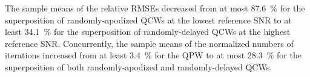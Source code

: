 The sample means of
the relative \acp{RMSE} decreased from
at most \SI{87.6}{\percent} for
the superposition of
randomly-apodized \acp{QCW} at
the lowest reference \ac{SNR} to
at least \SI{34.1}{\percent} for
the superposition of
randomly-delayed \acp{QCW} at
the highest reference \ac{SNR}.
Concurrently,
the sample means of
the normalized numbers of
iterations increased from
at least \SI{3.4}{\percent} for
the \ac{QPW} to
at most \SI{28.3}{\percent} for
the superposition of both
randomly-apodized and
randomly-delayed \acp{QCW}.
